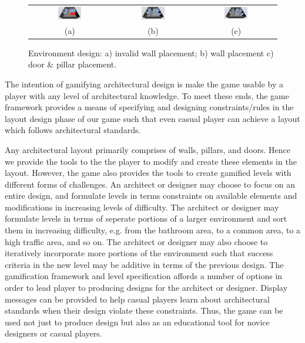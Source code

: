 \begin{figure} 
	\begin{tabular}{c c c}
	\includegraphics[width=0.31\textwidth]{images/InvalidWallPlacement.png} & \includegraphics[width=0.31\textwidth]{images/ValidWallPlacement.png} & \includegraphics[width=0.31\textwidth]{images/ValidDoorAndPillarPlacement.png} \\
	(a) & (b) & (c)
	\end{tabular}
\caption{\label{fig:env-design}Environment design: a) invalid wall placement; b) wall placement c) door \& pillar placement.}  
\end{figure}

The intention of gamifying architectural design is make the game usable by a player with any level of architectural knowledge. To meet these ends, the game framework provides a means of specifying and designing constraints/rules in the layout design phase of our game such that even casual player can achieve a layout which follows architectural standards.

Any architectural layout primarily comprises of walls, pillars, and doors. Hence we provide the tools to the the player to modify and create these elements in the layout. However, the game also provides the tools to create gamified levels with different forms of challenges. An architect or designer may choose to focus on an entire design, and formulate levels in terms constraints on available elements and modifications in increasing levels of difficulty.  The architect or designer may formulate levels in terms of seperate portions of a larger environment and sort them in increasing difficulty, e.g. from the bathroom area, to a common area, to a high traffic area, and so on. The architect or designer may also choose to iteratively incorporate more portions of the environment such that success criteria in the new level may be additive in terms of the previous design.  The gamification framework and level specification affords a number of options in order to lead player to producing designs for the architect or designer.  Display messages can be provided to help casual players learn about architectural standards when their design violate these constraints. Thus, the game can be used not just to produce design but also as an educational tool for novice designers or casual players.
